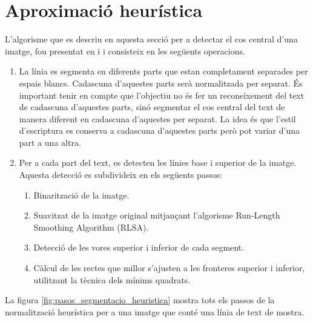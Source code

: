 \section{Aproximació heurística}
\label{sec:seg_heur}
L'algorisme que es descriu en aquesta secció per a detectar el cos central d'una imatge, fou presentat en \cite{Romero05} i \cite{Pastor07} i consisteix en les següents operacions.
\begin{enumerate}
\item La línia es segmenta en diferents parts que estan completament separades per espais blancs. Cadascuna d'aquestes parts serà normalitzada per separat. És important tenir en compte que l'objectiu no és fer un reconeixement del text de cadascuna d'aquestes parts, sinó segmentar el cos central del text de manera diferent en cadascuna d'aquestes per separat. La idea és que l'estil d'escriptura es conserva a cadascuna d'aquestes parts però pot variar d'una part a una altra.
\item Per a cada part del text, es detecten les línies base i superior de la imatge. Aquesta detecció es subdivideix en els següents passos:
\begin{enumerate}
\item Binarització de la imatge.
\item Suavitzat de la imatge original mitjançant l'algorisme Run-Length Smoothing Algorithm (RLSA).
\item Detecció de les vores superior i inferior de cada segment.
\item Càlcul de les rectes que millor s'ajusten a les fronteres superior i inferior, utilitzant la tècnica dels mínims quadrats.
\end{enumerate}
\end{enumerate}

La figura \ref{fig:pasos_segmentacio_heuristica} mostra tots els passos de la normalització heurística per a una imatge que conté una línia de text de mostra.\\

